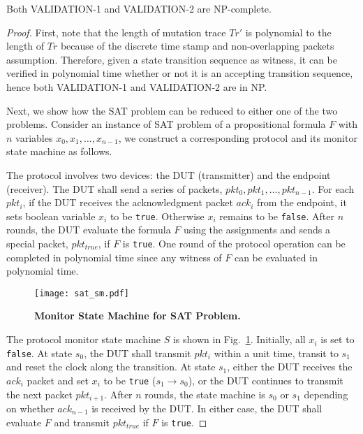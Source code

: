 \begin{lemma}
  \label{lem:sub}
  Both VALIDATION-1 and VALIDATION-2 are NP-complete.
\end{lemma}
\begin{proof}
  First, note that the length of mutation trace $Tr'$ is polynomial to the
  length of $Tr$ because of the discrete time stamp and non-overlapping packets
  assumption.
  Therefore, given a state transition sequence as witness, it can be verified in
  polynomial time whether or not it is an accepting transition sequence, hence
  both VALIDATION-1 and VALIDATION-2 are in NP.

  Next, we show how the SAT problem can be reduced to either one of the two
  problems.
  Consider an instance of SAT problem of a propositional formula $F$ with $n$
  variables $x_0,x_1,\ldots, x_{n-1}$, we construct a corresponding protocol and
  its monitor state machine as follows.

  The protocol involves two devices: the DUT (transmitter) and the endpoint
  (receiver).
  The DUT shall send a series of packets, $pkt_0, pkt_1,\ldots, pkt_{n-1}$.
  For each $pkt_i$, if the DUT receives the
  acknowledgment packet $ack_i$ from the endpoint, it sets boolean variable
  $x_i$ to be \texttt{true}.
  Otherwise $x_i$ remains to be \texttt{false}.
  After $n$ rounds, the DUT evaluate the formula $F$ using the assignments and
  sends a special packet, $pkt_{true}$, if $F$ is \texttt{true}.
  One round of the protocol operation can be completed in polynomial time since
  any witness of $F$ can be evaluated in polynomial time.

  \begin{figure}[t!]
    \centering
    \texttt{[image: sat\_sm.pdf]}
    \caption{\textbf{Monitor State Machine for SAT Problem.}}
    \label{fig:sat}
  \end{figure}



  The protocol monitor state machine $S$ is shown in Fig.~\ref{fig:sat}.
  Initially, all $x_i$ is set to \texttt{false}.
  At state $s_0$, the DUT shall transmit $pkt_i$ within a unit time, transit to
  $s_1$ and reset the clock along the transition.
  At state $s_1$, either the DUT receives the $ack_i$ packet and
  set $x_i$ to be \texttt{true} ($s_1 \rightarrow s_0$), or the DUT continues to
  transmit the next packet $pkt_{i+1}$.
  After $n$ rounds, the state machine is $s_0$ or $s_1$ depending on whether
  $ack_{n-1}$ is received by the DUT.
  In either case, the DUT shall evaluate $F$ and transmit $pkt_{true}$ if $F$ is
  \texttt{true}.  


\end{proof}
